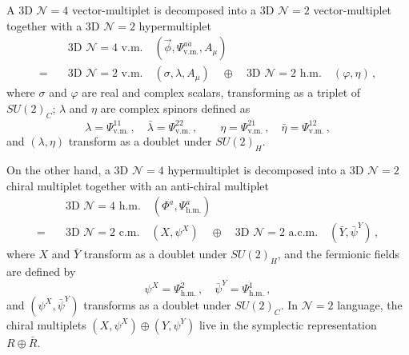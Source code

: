 \documentclass[12pt,a4paper]{article}
\renewcommand{\(}{\left(}
\renewcommand{\)}{\right)}
\renewcommand{\(}{\left(}
\renewcommand{\)}{\right)}
\begin{document}
A 3D $\mathcal{N}=4$ vector-multiplet is decomposed into a 3D $\mathcal{N}=2$ vector-multiplet together with a 3D $\mathcal{N}=2$ hypermultiplet
\begin{equation}
\begin{aligned}
&\textrm{3D $\mathcal{N}=4$ v.m.} \quad (\vec{\phi}, \Psi^{a\dot{a}}_{\textrm{v.m.}},A_{\mu}) \\
=\quad &\textrm{3D $\mathcal{N}=2$ v.m.} \quad (\sigma, \lambda,A_{\mu}) \quad
\oplus \quad \textrm{3D $\mathcal{N}=2$ h.m.} \quad (\varphi, \eta)\,,
\end{aligned}    
\end{equation}
where $\sigma$ and $\varphi$ are real and complex scalars, transforming as a triplet of $SU(2)_C$; $\lambda$ and $\eta$ are complex spinors defined as
\begin{equation}
\lambda=\Psi^{1\dot{1}}_{\textrm{v.m.}}\,,\quad \bar{\lambda}=\Psi^{2\dot{2}}_{\textrm{v.m.}}\,,\qquad \eta=\Psi^{2\dot{1}}_{\textrm{v.m.}}\,,\quad \bar{\eta}=\Psi^{1\dot{2}}_{\textrm{v.m.}}\,,
\end{equation}
and $(\lambda,\eta)$ transform as a doublet under $SU(2)_H$.
	
On the other hand, a 3D $\mathcal{N}=4$ hypermultiplet is decomposed into a 3D $\mathcal{N}=2$ chiral multiplet together with an anti-chiral multiplet
\begin{equation}
\begin{aligned}
&\textrm{3D $\mathcal{N}=4$ h.m.} \quad (\Phi^{a}, \Psi^{\dot{a}}_{\textrm{h.m.}})  \\
=\quad &\textrm{3D $\mathcal{N}=2$ c.m.} \quad (X, \psi^{X}) 
\quad
\oplus \quad 
\textrm{3D $\mathcal{N}=2$ a.c.m.} \quad (\bar{Y}, \bar{\psi}^{Y}) \,,
\end{aligned}    
\end{equation}
where $X$ and $\bar{Y}$ transform as a doublet under $SU(2)_H$, and the fermionic fields are defined by
\begin{equation}
\psi^X=\Psi^{\dot{2}}_{\textrm{h.m.}}\,,\quad   \bar{\psi}^Y=\Psi^{\dot{1}}_{\textrm{h.m.}}\,,
\end{equation}
and $(\psi^X,\bar{\psi}^{Y})$ transforms as a doublet under $SU(2)_C$. 
In $\mathcal{N}=2$ language, the chiral multiplets $(X,\psi^X)\oplus (Y,\psi^Y)$ live in the symplectic representation $ R\oplus \bar{R}$.
\end{document}
